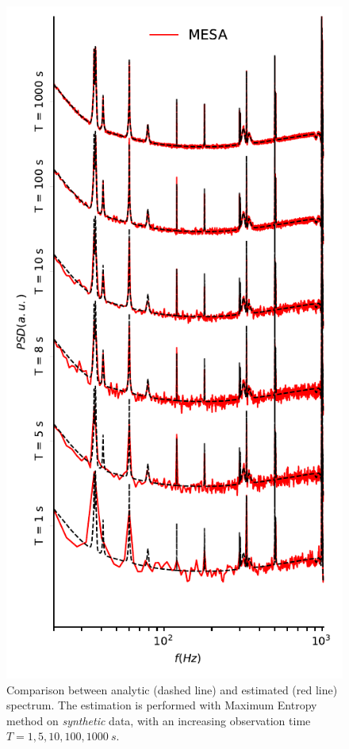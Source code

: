 \documentclass[epj,nopacs]{svjour}
\begin{document}
\begin{figure}

\begin{minipage}{0.99\columnwidth}
	\caption{Comparison between analytic (dashed line) and estimated (red line) spectrum. The estimation is performed with Maximum Entropy method on \textit{synthetic} data, with an increasing observation time $T = 1, 5, 10, 100, \SI{1000}{s}$.}
	\label{fig:MESA_LIGO_data}
	\includegraphics{Images/comparison_LVC_data/comparison_LVC_data_MESA.pdf}

\end{minipage}
\end{figure}
\end{document}
